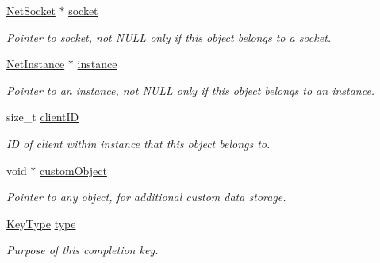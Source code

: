 \begin{DoxyCompactItemize}
\item 
\hypertarget{class_completion_key_a277a71c81d700138d73fb918c41ee8e2}{
\hyperlink{class_net_socket}{NetSocket} $\ast$ \hyperlink{class_completion_key_a277a71c81d700138d73fb918c41ee8e2}{socket}}
\label{class_completion_key_a277a71c81d700138d73fb918c41ee8e2}

\begin{DoxyCompactList}\small\item\em Pointer to socket, not NULL only if this object belongs to a socket. \item\end{DoxyCompactList}\item 
\hypertarget{class_completion_key_a56e795d930e82555049fbf97c82f6493}{
\hyperlink{class_net_instance}{NetInstance} $\ast$ \hyperlink{class_completion_key_a56e795d930e82555049fbf97c82f6493}{instance}}
\label{class_completion_key_a56e795d930e82555049fbf97c82f6493}

\begin{DoxyCompactList}\small\item\em Pointer to an instance, not NULL only if this object belongs to an instance. \item\end{DoxyCompactList}\item 
\hypertarget{class_completion_key_ae434a173023d23d9cc22b131509d0325}{
size\_\-t \hyperlink{class_completion_key_ae434a173023d23d9cc22b131509d0325}{clientID}}
\label{class_completion_key_ae434a173023d23d9cc22b131509d0325}

\begin{DoxyCompactList}\small\item\em ID of client within instance that this object belongs to. \item\end{DoxyCompactList}\item 
\hypertarget{class_completion_key_aa74de82c848029cc41fe974edf6eef59}{
void $\ast$ \hyperlink{class_completion_key_aa74de82c848029cc41fe974edf6eef59}{customObject}}
\label{class_completion_key_aa74de82c848029cc41fe974edf6eef59}

\begin{DoxyCompactList}\small\item\em Pointer to any object, for additional custom data storage. \item\end{DoxyCompactList}\item 
\hypertarget{class_completion_key_a9baa44ea64d0e6b40e8863b1f4d6c2dd}{
\hyperlink{class_completion_key_ad0789e8ca951edd8ee5b1b2fb7cdd8b4}{KeyType} \hyperlink{class_completion_key_a9baa44ea64d0e6b40e8863b1f4d6c2dd}{type}}
\label{class_completion_key_a9baa44ea64d0e6b40e8863b1f4d6c2dd}

\begin{DoxyCompactList}\small\item\em Purpose of this completion key. \item\end{DoxyCompactList}\end{DoxyCompactItemize}


